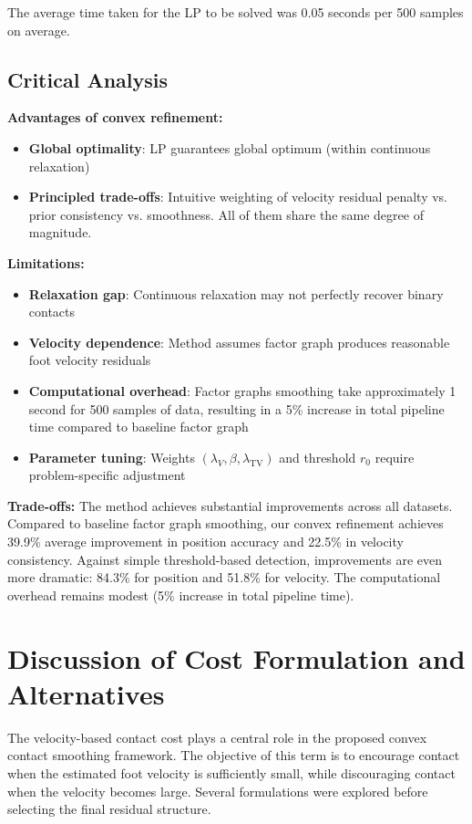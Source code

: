 \documentclass[conference]{IEEEtran}
\begin{document}
The average time taken for the LP to be solved was 0.05 seconds per 500 samples on average.

\subsection{Critical Analysis}

\textbf{Advantages of convex refinement:}
\begin{itemize}
\item \textbf{Global optimality}: LP guarantees global optimum (within continuous relaxation)
\item \textbf{Principled trade-offs}: Intuitive weighting of velocity residual penalty vs. prior consistency vs. smoothness. All of them share the same degree of magnitude.
\end{itemize}

\textbf{Limitations:}
\begin{itemize}
\item \textbf{Relaxation gap}: Continuous relaxation may not perfectly recover binary contacts
\item \textbf{Velocity dependence}: Method assumes factor graph produces reasonable foot velocity residuals
\item \textbf{Computational overhead}: Factor graphs smoothing take approximately 1 second for 500 samples of data, resulting in a 5\% increase in total pipeline time compared to baseline factor graph
\item \textbf{Parameter tuning}: Weights $(\lambda_V, \beta, \lambda_{\text{TV}})$ and threshold $r_0$ require problem-specific adjustment
\end{itemize}

\textbf{Trade-offs:}
The method achieves substantial improvements across all datasets. Compared to baseline factor graph smoothing, our convex refinement achieves 39.9\% average improvement in position accuracy and 22.5\% in velocity consistency. Against simple threshold-based detection, improvements are even more dramatic: 84.3\% for position and 51.8\% for velocity. The computational overhead remains modest (5\% increase in total pipeline time).

\section{Discussion of Cost Formulation and Alternatives}

The velocity-based contact cost plays a central role in the proposed convex contact smoothing framework. The objective of this term is to encourage contact when the estimated foot velocity is sufficiently small, while discouraging contact when the velocity becomes large. Several formulations were explored before selecting the final residual structure.
\end{document}
